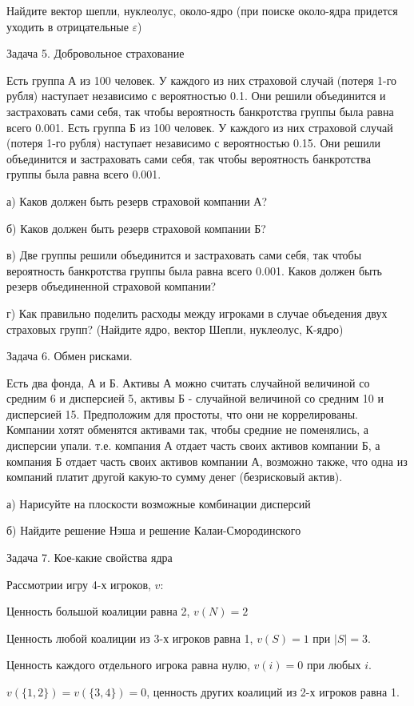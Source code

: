 Найдите вектор шепли, нуклеолус, около-ядро (при поиске около-ядра придется уходить в отрицательные $\varepsilon$)


Задача 5. Добровольное страхование

Есть группа А из 100 человек. У каждого из них страховой случай (потеря 1-го рубля) наступает независимо с вероятностью 0.1. Они решили объединится и застраховать сами себя, так чтобы вероятность банкротства группы была равна всего 0.001. 
Есть группа Б из 100 человек. У каждого из них страховой случай (потеря 1-го рубля) наступает независимо с вероятностью 0.15. Они решили объединится и застраховать сами себя, так чтобы вероятность банкротства группы была равна всего 0.001. 

а) Каков должен быть резерв страховой компании А?

б)  Каков должен быть резерв страховой компании Б?

в) Две группы решили объединится и застраховать сами себя, так чтобы вероятность банкротства группы была равна всего 0.001. Каков должен быть резерв объединенной страховой компании? 

г) Как правильно поделить расходы между игроками в случае объедения двух страховых групп? (Найдите ядро, вектор Шепли, нуклеолус, К-ядро)

Задача 6. Обмен рисками.

Есть два фонда, А и Б. Активы А можно считать случайной величиной со средним 6 и дисперсией 5, активы Б - случайной величиной со средним 10 и дисперсией 15. Предположим для простоты, что они не коррелированы. Компании хотят обменятся активами так, чтобы средние не поменялись, а дисперсии упали. т.е. компания А отдает часть своих активов компании Б, а компания Б отдает часть своих активов компании А, возможно также, что одна из компаний платит другой какую-то сумму денег (безрисковый актив).

а) Нарисуйте на плоскости возможные комбинации дисперсий

б) Найдите решение Нэша и решение Калаи-Смородинского


Задача 7. Кое-какие свойства ядра

Рассмотрии игру 4-х игроков, $v$:

Ценность большой коалиции равна 2, $v(N)=2$

Ценность любой коалиции из 3-х игроков равна 1, $v(S)=1$ при $|S|=3$.

Ценность каждого отдельного игрока равна нулю, $v(i)=0$ при любых $i$.

$v(\{1,2\})=v(\{3,4\})=0$, ценность других коалиций из 2-х игроков равна 1.

